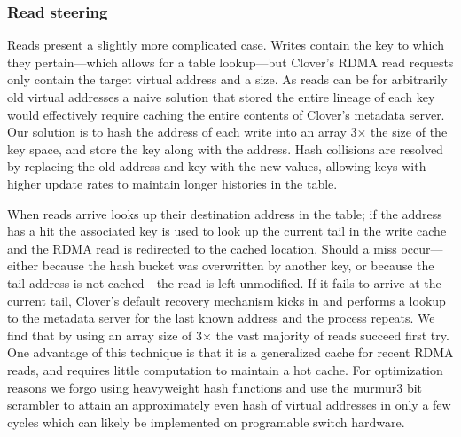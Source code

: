 
\subsubsection{Read steering}

Reads present a slightly more complicated case. Writes contain the key
to which they pertain---which allows for a table lookup---but Clover's
RDMA read requests only contain the target virtual address and a size.
As reads can be for arbitrarily old virtual addresses a naive solution
that stored the entire lineage of each key would effectively require
caching the entire contents of Clover's metadata server.  Our solution
is to hash the address of each write into an array 3$\times$
the size of the key space, and store the key along with the address.
Hash collisions are resolved by replacing the old address and key with
the new values, allowing keys with higher update rates to maintain
longer histories in the table. 

When reads arrive {\sword} looks up their destination address in the table; if
the address has a hit the associated key is used to look up the current tail in
the write cache and the RDMA read is redirected to the cached location.  Should
a miss occur---either because the hash bucket was overwritten by another key, or
because the tail address is not cached---the read is left unmodified.  If it
fails to arrive at the current tail, Clover's default recovery mechanism kicks
in and performs a lookup to the metadata server for the last known address and
the process repeats. We find that by using an array size of 3$\times$ the vast
majority of reads succeed first try. One advantage of this technique is that it
is a generalized cache for recent RDMA reads, and requires little computation to
maintain a hot cache. For optimization reasons we forgo using heavyweight hash
functions and use the murmur3 bit scrambler to attain an approximately even hash
of virtual addresses in only a few cycles which can likely be implemented on
programable switch hardware.

